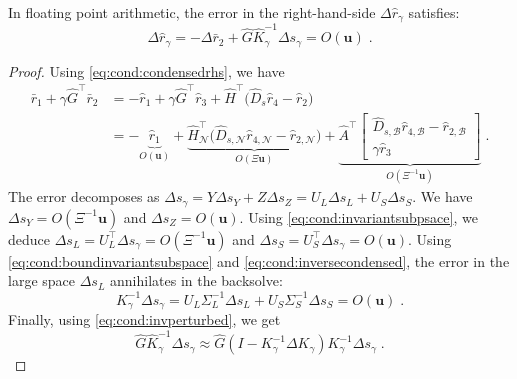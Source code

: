 \documentclass[smallextended]{svjour3}
\newcommand{\epstol}{\mathbf{u}}
\newcommand{\cactive}{\mathcal{B}}
\newcommand{\cinactive}{\mathcal{N}}
\begin{document}
\begin{proposition}
In floating point arithmetic, the error in the right-hand-side $\Delta \widehat{r}_\gamma$ satisfies:
\begin{equation}
  \label{eq:cond:errorrgamma}
  \Delta \widehat{r}_\gamma = -\Delta \bar{r}_2 + \widehat{G} \widehat{K}_\gamma^{-1} \Delta s_\gamma = O(\epstol) \;.
\end{equation}
\end{proposition}
\begin{proof}
Using \eqref{eq:cond:condensedrhs}, we have
\begin{equation*}
  \label{eq:cond:boundderivationhykkt}
  \begin{aligned}
  \bar{r}_1 + \gamma \widehat{G}^\top \bar{r}_2 &=
- \widehat{r}_1 + \gamma \widehat{G}^\top \widehat{r}_3+ \widehat{H}^\top\big(\widehat{D}_{s} \widehat{r}_{4} - \widehat{r}_{2} \big) \\
&=  -
\underbrace{\widehat{r}_1}_{O(\epstol)} +
\underbrace{
\widehat{H}_{\cinactive}^\top\big(\widehat{D}_{s,\cinactive} \widehat{r}_{4,\cinactive} - \widehat{r}_{2,\cinactive} \big)}_{O(\Xi \epstol)}
+ \underbrace{\widehat{A}^\top \begin{bmatrix}
  \widehat{D}_{s,\cactive} \widehat{r}_{4,\cactive} - \widehat{r}_{2,\cactive}  \\
  \gamma \widehat{r}_3
\end{bmatrix}}_{O(\Xi^{-1}\epstol)} \; .
  \end{aligned}
\end{equation*}
The error decomposes as $\Delta s_\gamma = Y \Delta s_Y  + Z \Delta s_Z
= U_L \Delta s_L + U_S \Delta s_S$.
We have $\Delta s_Y = O(\Xi^{-1} \epstol)$ and $\Delta s_Z = O(\epstol)$.
Using \eqref{eq:cond:invariantsubpsace}, we deduce
$\Delta s_L = U_L^\top \Delta s_\gamma = O(\Xi^{-1} \epstol)$ and
$\Delta s_S = U_S^\top \Delta s_\gamma = O(\epstol)$.
Using \eqref{eq:cond:boundinvariantsubspace} and \eqref{eq:cond:inversecondensed},
the error in the large space $\Delta s_L$ annihilates in the backsolve:
\begin{equation}
  \label{eq:cond:boundhykkt1}
  K_\gamma^{-1} \Delta s_\gamma = U_L \Sigma_L^{-1} \Delta s_L + U_S \Sigma_S^{-1} \Delta s_S  = O(\epstol)
  \; .
\end{equation}
Finally, using \eqref{eq:cond:invperturbed}, we get
\begin{equation}
  \widehat{G} \widehat{K}_\gamma^{-1} \Delta s_\gamma \approx
  \widehat{G} (I - K_\gamma^{-1}\Delta K_\gamma) K_\gamma^{-1} \Delta s_\gamma \; .

\end{equation}
\end{proof}
\end{document}
